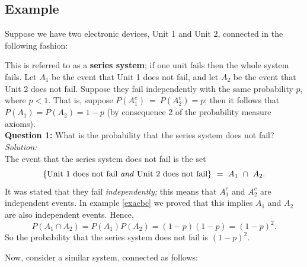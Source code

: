 \subsection{Example} \label{series system} \label{parallel system}
Suppose we have two electronic devices, Unit 1 and Unit 2, connected in the following fashion:
\begin{center}
\end{center}
This is referred to as a \textbf{series system}; if one unit fails then the whole system fails.
Let $A_1$ be the event that Unit 1 does not fail, and let $A_2$ be the event that Unit 2 does not fail. Suppose they fail independently with the same probability $p$, where $p < 1$. That is, suppose $P(A_1^c)~=~P(A_2^c) = p$; then it follows that $P(A_1) = P(A_2) = 1-p$ (by consequence 2 of the probability measure axioms). \\

\noindent \textbf{Question 1:} What is the probability that the series system does not fail? \\

\noindent \textit{Solution:} \\
The event that the series system does not fail is the set
\[
\left\{\text{Unit 1 does not fail \textit{and} Unit 2 does not fail}\right\}~=~A_1~\cap~A_2.
\] 
It was stated that they fail \textit{independently;} this means that $A_1^c$ and $A_2^c$ are independent events. In example \ref{exacbc} we proved that this implies $A_1$ and $A_2$ are also independent events. Hence,
\[
P(A_1 \cap A_2) = P(A_1)P(A_2) = (1-p)(1-p) = (1-p)^2.
\]
So the probability that the series system does not fail is $(1-p)^2.$
\vspace{1cm}

\noindent Now, consider a similar system, connected as follows:

\begin{center}
\end{center}

